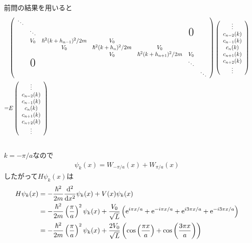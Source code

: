\documentclass[uplatex,a4j,11pt,dvipdfmx]{jsarticle}
\begin{document}
\subsection{}
前問の結果を用いると
\begin{align*}&\left(
  \begin{array}{ccccccc}
    \ddots\\
    &\ddots&&&&\text{\huge{0}}\\
    &V_0&{\hbar^2(k+h_{n-1})^2}/{2m}&V_0\\
    &&V_0&{\hbar^2(k+h_{n})^2}/{2m}&V_0\\
    &&&V_0&{\hbar^2(k+h_{n+1})^2}/{2m}&V_0\\
    &\text{\huge{0}}&&&&\ddots\\
    &&&&&&\ddots
  \end{array}\right)
  \left(
  \begin{array}{c}
    \vdots\\
    c_{n-2}(k)\\
    c_{n-1}(k)\\
    c_{n}(k)\\
    c_{n+1}(k)\\
    c_{n+2}(k)\\
    \vdots
  \end{array}
  \right)\\
  =&E
  \left(
    \begin{array}{c}
      \vdots\\
      c_{n-2}(k)\\
      c_{n-1}(k)\\
      c_{n}(k)\\
      c_{n+1}(k)\\
      c_{n+2}(k)\\
      \vdots
    \end{array}
  \right)
\end{align*}
\subsection{}
$k=-\pi/a$なので
\begin{align*}
  \psi_k(x)=W_{-\pi/a}(x)+W_{\pi/a}(x)
\end{align*}
したがって$H\psi_k(x)$は
\begin{align*}
  H\psi_k(x)&=-\frac{\hbar^2}{2m}\frac{{\rm d}^2}{{\rm d}x^2}\psi_k(x)+V(x)\psi_k(x)\\
  &=-\frac{\hbar^2}{2m}\left(\frac{\pi}{a}\right)^2\psi_k(x)+\frac{V_0}{\sqrt{L}}\left({\rm e}^{i\pi x/a}+{\rm e}^{-i\pi x/a}+{\rm e}^{i3\pi x/a}+{\rm e}^{-i3\pi x/a}\right)\\
  &=-\frac{\hbar^2}{2m}\left(\frac{\pi}{a}\right)^2\psi_k(x)+\frac{2V_0}{\sqrt{L}}\left(\cos\left(\frac{\pi x}{a}\right)+\cos\left(\frac{3\pi x}{a}\right)\right)
\end{align*}
\end{document}

